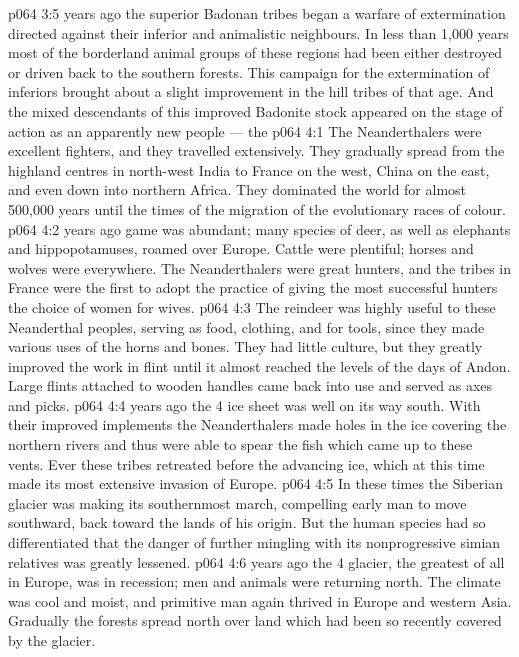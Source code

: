 \vs p064 3:5 \pc {} years ago the superior Badonan tribes began a warfare of extermination directed against their inferior and animalistic neighbours. In less than 1,000 years most of the borderland animal groups of these regions had been either destroyed or driven back to the southern forests. This campaign for the extermination of inferiors brought about a slight improvement in the hill tribes of that age. And the mixed descendants of this improved Badonite stock appeared on the stage of action as an apparently new people --- the 
\vs p064 4:1 The Neanderthalers were excellent fighters, and they travelled extensively. They gradually spread from the highland centres in north\hyp{}west India to France on the west, China on the east, and even down into northern Africa. They dominated the world for almost 500,000 years until the times of the migration of the evolutionary races of colour.
\vs p064 4:2 \pc {} years ago game was abundant; many species of deer, as well as elephants and hippopotamuses, roamed over Europe. Cattle were plentiful; horses and wolves were everywhere. The Neanderthalers were great hunters, and the tribes in France were the first to adopt the practice of giving the most successful hunters the choice of women for wives.
\vs p064 4:3 The reindeer was highly useful to these Neanderthal peoples, serving as food, clothing, and for tools, since they made various uses of the horns and bones. They had little culture, but they greatly improved the work in flint until it almost reached the levels of the days of Andon. Large flints attached to wooden handles came back into use and served as axes and picks.
\vs p064 4:4 \pc {} years ago the 4 ice sheet was well on its way south. With their improved implements the Neanderthalers made holes in the ice covering the northern rivers and thus were able to spear the fish which came up to these vents. Ever these tribes retreated before the advancing ice, which at this time made its most extensive invasion of Europe.
\vs p064 4:5 In these times the Siberian glacier was making its southernmost march, compelling early man to move southward, back toward the lands of his origin. But the human species had so differentiated that the danger of further mingling with its nonprogressive simian relatives was greatly lessened.
\vs p064 4:6 \pc {} years ago the 4 glacier, the greatest of all in Europe, was in recession; men and animals were returning north. The climate was cool and moist, and primitive man again thrived in Europe and western Asia. Gradually the forests spread north over land which had been so recently covered by the glacier.
